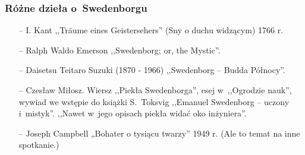 \documentclass[10pt,t]{beamer}
\begin{document}
\begin{frame}
\begin{frame}
  \frametitle{Różne dzieła o~Swedenborgu}


  \begin{itemize}

  \item[--] I. Kant ,,Träume eines Geistersehers'' (Sny o duchu widzącym) 1766 r.

\item[--] Ralph Waldo Emerson ,,Swedenborg; or, the Mystic''.

\item[--] Daisetsu Teitaro Suzuki (1870 - 1966) ,,Swedenborg -- Budda Północy''.

\item[--] Czesław Miłosz. Wiersz ,,Piekła Swedenborga'', esej w~,,Ogrodzie nauk'', wywiad we wstępie do książki S.~Toksvig ,,Emanuel Swedenborg -- uczony i~mistyk''. ,,Nawet w~jego opisach piekła widać oko inżyniera''.

\item[--] Joseph Campbell „Bohater o tysiącu twarzy” 1949 r. (Ale to temat na inne spotkanie.)

\end{itemize}

\end{frame}













\end{frame}
\end{document}
